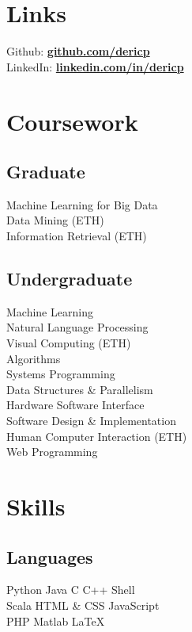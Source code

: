 \documentclass[]{deedy-resume}
\begin{document}
\begin{minipage}[t]{0.33\textwidth}

\section{Links} 
Github: \href{https://github.com/dericp}{\bf github.com/dericp} \\
LinkedIn: \href{https://www.linkedin.com/in/dericp}{\bf linkedin.com/in/dericp}
\sectionsep


\section{Coursework}
\subsection{Graduate}
Machine Learning for Big Data\\
Data Mining (ETH)\\
Information Retrieval (ETH)
\sectionsep

\subsection{Undergraduate}
Machine Learning\\
Natural Language Processing\\
Visual Computing (ETH)\\
Algorithms\\
Systems Programming\\
Data Structures \& Parallelism\\
Hardware Software Interface\\
Software Design \& Implementation\\
Human Computer Interaction (ETH)\\
Web Programming


\section{Skills}
\subsection{Languages}
Python \textbullet{} Java \textbullet{} C \textbullet{} C++ \textbullet{} Shell\\
Scala \textbullet{} HTML \& CSS \textbullet{} JavaScript\\
PHP \textbullet{} Matlab \textbullet{} \LaTeX\ \\ 
\sectionsep

\end{minipage}
\end{document}

